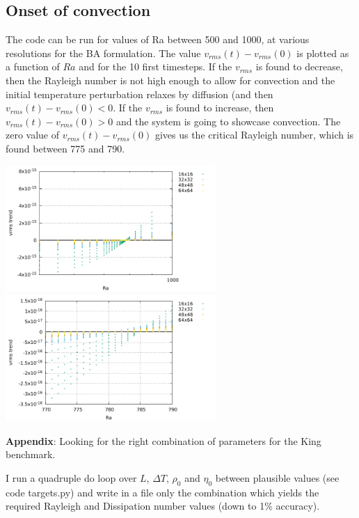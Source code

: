 \newpage
\subsection*{Onset of convection}

The code can be run for values of Ra between 500 and 1000, at various resolutions for the BA formulation.
The value $v_{rms}(t)-v_{rms}(0)$ is plotted as a function of $Ra$ and for the 10 first timesteps. If the $v_{rms}$
is found to decrease, then the Rayleigh number is not high enough to allow for convection and the initial temperature
perturbation relaxes by diffusion (and then $v_{rms}(t)-v_{rms}(0)<0$. If the $v_{rms}$ is found to increase, then 
$v_{rms}(t)-v_{rms}(0)>0$ and the system is going to showcase convection. The zero value of $v_{rms}(t)-v_{rms}(0)$ 
gives us the critical Rayleigh number, which is found between 775 and 790. 


\begin{center}
\includegraphics[width=8cm]{python_codes/fieldstone_24/ONSET/onset.pdf} 
\includegraphics[width=8cm]{python_codes/fieldstone_24/ONSET/onset_zoom.pdf}
\end{center}

\newpage
{\bf Appendix}: Looking for the right combination of parameters for the King benchmark.

I run a quadruple do loop over $L$, $\Delta T$, $\rho_0$ and $\eta_0$ between plausible values 
(see code targets.py) and write in a file only the combination which yields the 
required Rayleigh and Dissipation number values (down to 1\% accuracy).

